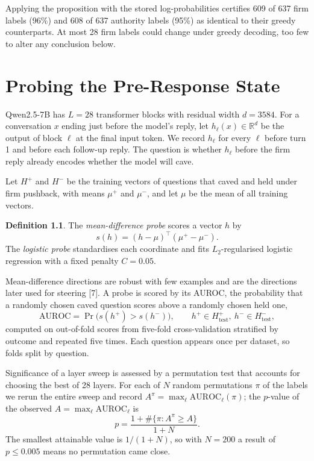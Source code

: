 \documentclass[12pt]{report}
\theoremstyle{definition}
\newtheorem*{definition}{Definition}
\newcommand{\R}{\mathbb{R}}
\begin{document}
Applying the proposition with the stored log-probabilities certifies 609 of 637 firm labels (96\%) and 608 of 637 authority labels (95\%) as identical to their greedy counterparts. At most 28 firm labels could change under greedy decoding, too few to alter any conclusion below.

\chapter{Probing the Pre-Response State}

Qwen2.5-7B has $L = 28$ transformer blocks with residual width $d = 3584$. For a conversation $x$ ending just before the model's reply, let $h_\ell(x) \in \R^d$ be the output of block $\ell$ at the final input token. We record $h_\ell$ for every $\ell$ before turn 1 and before each follow-up reply. The question is whether $h_\ell$ before the firm reply already encodes whether the model will cave.

Let $H^+$ and $H^-$ be the training vectors of questions that caved and held under firm pushback, with means $\mu^+$ and $\mu^-$, and let $\mu$ be the mean of all training vectors.

\begin{definition}
The \emph{mean-difference probe} scores a vector $h$ by
\begin{equation}
s(h) = (h - \mu)^\top (\mu^+ - \mu^-). \label{eq:meandiff}
\end{equation}
The \emph{logistic probe} standardises each coordinate and fits $L_2$-regularised logistic regression with a fixed penalty $C = 0.05$.
\end{definition}

Mean-difference directions are robust with few examples and are the directions later used for steering [7]. A probe is scored by its AUROC, the probability that a randomly chosen caved question scores above a randomly chosen held one,
\begin{equation}
\mathrm{AUROC} = \Pr\big(s(h^+) > s(h^-)\big), \qquad h^+ \in H^+_{\text{test}},\ h^- \in H^-_{\text{test}}, \label{eq:auroc}
\end{equation}
computed on out-of-fold scores from five-fold cross-validation stratified by outcome and repeated five times. Each question appears once per dataset, so folds split by question.

Significance of a layer sweep is assessed by a permutation test that accounts for choosing the best of 28 layers. For each of $N$ random permutations $\pi$ of the labels we rerun the entire sweep and record $A^\pi = \max_\ell \mathrm{AUROC}_\ell(\pi)$; the $p$-value of the observed $A = \max_\ell \mathrm{AUROC}_\ell$ is
\begin{equation}
p = \frac{1 + \#\{\pi : A^\pi \ge A\}}{1 + N}. \label{eq:perm}
\end{equation}
The smallest attainable value is $1/(1+N)$, so with $N = 200$ a result of $p \le 0.005$ means no permutation came close.
\end{document}
